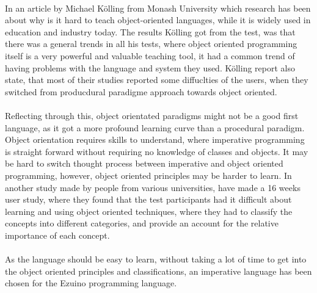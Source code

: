\\
In an article by Michael Kölling from Monash University which research has been about why is it hard to teach object-oriented languages, while it is widely used in education and industry today. The results Kölling got from the test, was that there was a general trends in all his tests, where object oriented programming itself is a very powerful and valuable teaching tool, it had a common trend of having problems with the language and system they used. Kölling report also state, that most of their studies reported some diffuclties of the users, when they switched from producdural paradigme approach towards object oriented.\cite{fuk1} \\
\\
Reflecting through this, object orientated paradigms might not be a good first language, as it got a more profound learning curve than a procedural paradigm. Object orientation requires skills to understand, where imperative programming is straight forward without requiring no knowledge of classes and objects. It may be hard to switch thought process between imperative and object oriented programming, however, object oriented principles may be harder to learn. In another study made by people from various universities, have made a 16 weeks user study, where they found that the test participants had it difficult about learning and using object oriented techniques, where they had to classify the concepts into different categories, and provide an account for the relative importance of each concept.\cite{fuk2}\\
\\
As the language should be easy to learn, without taking a lot of time to get into the object oriented principles and classifications, an imperative language has been chosen for the Ezuino programming language.